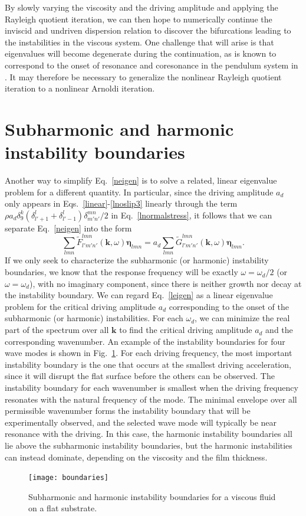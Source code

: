\documentclass[aps,pre,amsmath,amssymb,floatfix,onecolumn,notitlepage,10pt]{revtex4-1}
\begin{document}
By slowly varying the viscosity and the driving amplitude and applying the Rayleigh quotient iteration, we can then hope to numerically continue the inviscid and undriven dispersion relation to discover the bifurcations leading to the instabilities in the viscous system. One challenge that will arise is that eigenvalues will become degenerate during the continuation, as is known to correspond to the onset of resonance and coresonance in the pendulum system in \cite{2021_Nicolaou_2}. It may therefore be necessary to generalize the nonlinear Rayleigh quotient iteration to a nonlinear Arnoldi iteration.

\section{Subharmonic and harmonic instability boundaries}
Another way to simplify Eq.~\eqref{neigen} is to solve a related, linear eigenvalue problem for a different quantity. In particular, since the driving amplitude $a_d$ only appears in Eqs.~\eqref{linear}-\eqref{lnoslip3} linearly through the term $\rho a_d\delta_9^k(\delta_{l'+1}^l+\delta_{l'-1}^l)\delta_{m'n'}^{mn}/2$ in Eq.~\eqref{lnormalstress}, it follows that we can separate Eq.~\eqref{neigen} into the form
\begin{equation}
\sum_{lmn} \tilde{F}^{lmn}_{l'm'n'}(\mathbf{k},\omega) \bm{\eta}_{lmn} = a_d \sum_{lmn}  \tilde{G}^{lmn}_{l'm'n'}(\mathbf{k},\omega)\bm{\eta}_{lmn}. \label{leigen}
\end{equation}
If we only seek to characterize the subharmonic (or harmonic) instability boundaries, we know that the response frequency will be exactly $\omega  = \omega_d/2$ (or $\omega  = \omega_d$), with no imaginary component, since there is neither growth nor decay at the instability boundary. We can regard Eq.~\eqref{leigen} as a linear eigenvalue problem for the critical driving amplitude $a_d$ corresponding to the onset of the subharmonic (or harmonic) instabilities. For each $\omega_d$, we can minimize the real part of the spectrum over all $\mathbf{k}$ to find the critical driving amplitude $a_d$ and the corresponding wavenumber. An example of the instability boundaries for four wave modes is shown in Fig.~\ref{fig3}. For each driving frequency, the most important instability boundary is the one that occurs at the smallest driving acceleration, since it will disrupt the flat surface before the others can be observed.  The instability boundary for each wavenumber is smallest when the driving frequency resonates with the natural frequency of the mode. The minimal envelope over all permissible wavenumber forms the instability boundary that will be experimentally observed, and the selected wave mode will typically be near resonance with the driving. In this case, the harmonic instability boundaries all lie above the subharmonic instability boundaries, but the harmonic instabilities can instead dominate, depending on the viscosity and the film thickness. 
\begin{figure}[hbt]
\texttt{[image: boundaries]}
\caption{Subharmonic and harmonic instability boundaries for a viscous fluid on a flat substrate. \label{fig3}}
\end{figure}
\end{document}
